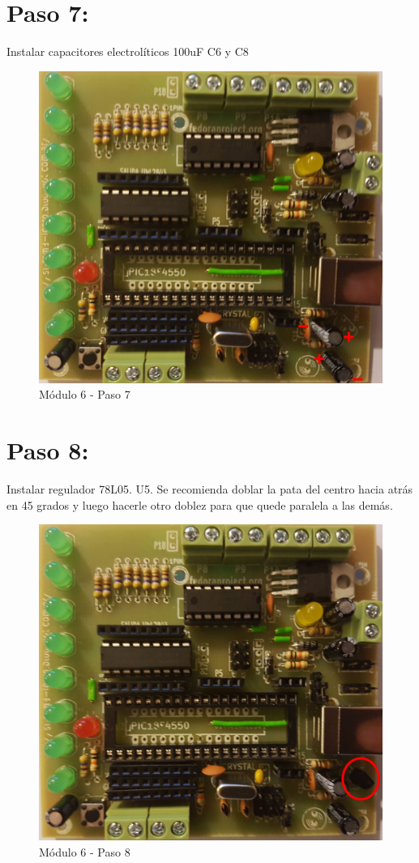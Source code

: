 \newpage

\section{Paso 7:}

Instalar capacitores electrolíticos 100uF C6 y C8

\begin{figure}[h]
	\centering
	\includegraphics[width=0.8\linewidth]{Modulo_6/M6_7}
	\caption{Módulo 6 - Paso 7}
	\label{fig:M6_7}
\end{figure}

\newpage

\section{Paso 8:}

Instalar regulador 78L05. U5. Se recomienda doblar la pata del centro hacia atrás en 45 grados y luego hacerle otro doblez para que quede paralela a las demás.


\begin{figure}[h]
	\centering
	\includegraphics[width=0.8\linewidth]{Modulo_6/M6_8}
	\caption{Módulo 6 - Paso 8}
	\label{fig:M6_8}
\end{figure}


